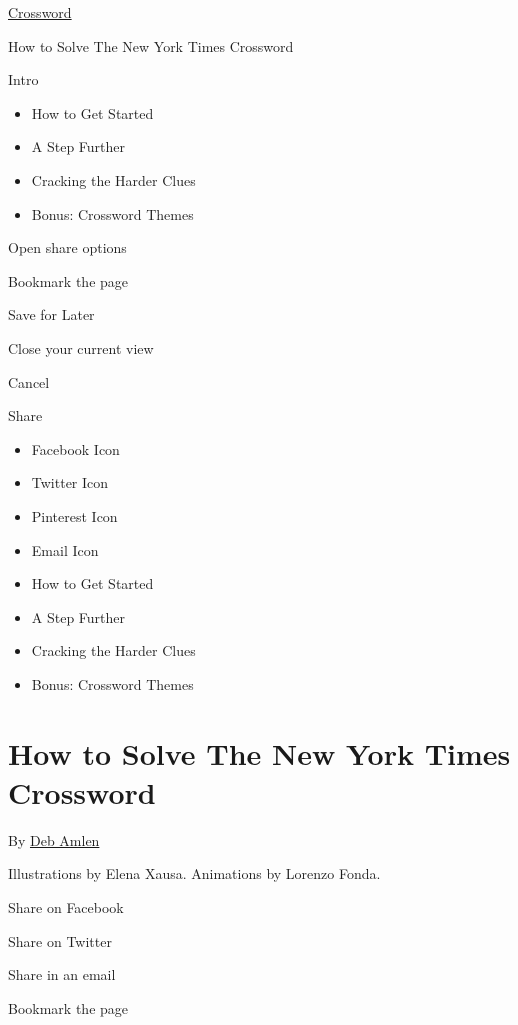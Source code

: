 \href{https://www.nytimes.com/crosswords}{Crossword}

How to Solve The New York Times Crossword

Intro

\begin{itemize}
\tightlist
\item
  How to Get Started
\item
  A Step Further
\item
  Cracking the Harder Clues
\item
  Bonus: Crossword Themes
\end{itemize}

Open share options

Bookmark the page

Save for Later

Close your current view

Cancel

Share

\begin{itemize}
\tightlist
\item
  Facebook Icon
\item
  Twitter Icon
\item
  Pinterest Icon
\item
  Email Icon
\end{itemize}

\begin{itemize}
\tightlist
\item
  How to Get Started
\item
  A Step Further
\item
  Cracking the Harder Clues
\item
  Bonus: Crossword Themes
\end{itemize}

\hypertarget{how-to-solve-the-new-york-times-crossword}{%
\section{How to Solve The New York Times
Crossword}\label{how-to-solve-the-new-york-times-crossword}}

By \href{https://www.twitter.com/NYTimesWordplay}{Deb Amlen}

Illustrations by Elena Xausa. Animations by Lorenzo Fonda.

Share on Facebook

Share on Twitter

Share in an email

Bookmark the page

